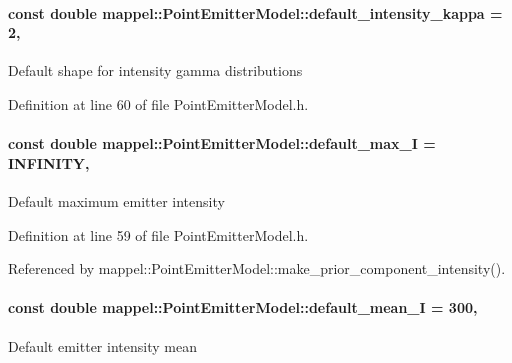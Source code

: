 \paragraph[{\texorpdfstring{default\+\_\+intensity\+\_\+kappa}{default_intensity_kappa}}]{\setlength{\rightskip}{0pt plus 5cm}const double mappel\+::\+Point\+Emitter\+Model\+::default\+\_\+intensity\+\_\+kappa = 2\hspace{0.3cm}{\ttfamily [static]}, {\ttfamily [inherited]}}\hypertarget{classmappel_1_1PointEmitterModel_ad1f21ed3be543deed3c78a0494cb2984}{}\label{classmappel_1_1PointEmitterModel_ad1f21ed3be543deed3c78a0494cb2984}
Default shape for intensity gamma distributions 

Definition at line 60 of file Point\+Emitter\+Model.\+h.

\paragraph[{\texorpdfstring{default\+\_\+max\+\_\+I}{default_max_I}}]{\setlength{\rightskip}{0pt plus 5cm}const double mappel\+::\+Point\+Emitter\+Model\+::default\+\_\+max\+\_\+I = I\+N\+F\+I\+N\+I\+TY\hspace{0.3cm}{\ttfamily [static]}, {\ttfamily [inherited]}}\hypertarget{classmappel_1_1PointEmitterModel_acca80757a9a285a9e6eedea167d038c7}{}\label{classmappel_1_1PointEmitterModel_acca80757a9a285a9e6eedea167d038c7}
Default maximum emitter intensity 

Definition at line 59 of file Point\+Emitter\+Model.\+h.



Referenced by mappel\+::\+Point\+Emitter\+Model\+::make\+\_\+prior\+\_\+component\+\_\+intensity().

\paragraph[{\texorpdfstring{default\+\_\+mean\+\_\+I}{default_mean_I}}]{\setlength{\rightskip}{0pt plus 5cm}const double mappel\+::\+Point\+Emitter\+Model\+::default\+\_\+mean\+\_\+I = 300\hspace{0.3cm}{\ttfamily [static]}, {\ttfamily [inherited]}}\hypertarget{classmappel_1_1PointEmitterModel_a575dd30a0afb886db82ac725c8cc8df3}{}\label{classmappel_1_1PointEmitterModel_a575dd30a0afb886db82ac725c8cc8df3}
Default emitter intensity mean 

